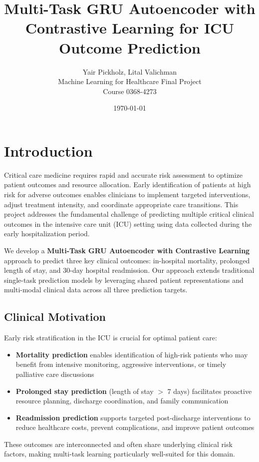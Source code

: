 \documentclass[11pt]{article}
\title{Multi-Task GRU Autoencoder with Contrastive Learning for ICU Outcome Prediction}
\author{Yair Pickholz, Lital Valichman\\
Machine Learning for Healthcare Final Project\\
Course 0368-4273}
\date{\today}
\begin{document}
\maketitle

\section{Introduction}

Critical care medicine requires rapid and accurate risk assessment to optimize patient outcomes and resource allocation. Early identification of patients at high risk for adverse outcomes enables clinicians to implement targeted interventions, adjust treatment intensity, and coordinate appropriate care transitions. This project addresses the fundamental challenge of predicting multiple critical clinical outcomes in the intensive care unit (ICU) setting using data collected during the early hospitalization period.

We develop a \textbf{Multi-Task GRU Autoencoder with Contrastive Learning} approach to predict three key clinical outcomes: in-hospital mortality, prolonged length of stay, and 30-day hospital readmission. Our approach extends traditional single-task prediction models by leveraging shared patient representations and multi-modal clinical data across all three prediction targets.

\subsection{Clinical Motivation}

Early risk stratification in the ICU is crucial for optimal patient care:

\begin{itemize}
    \item \textbf{Mortality prediction} enables identification of high-risk patients who may benefit from intensive monitoring, aggressive interventions, or timely palliative care discussions
    \item \textbf{Prolonged stay prediction} (length of stay $>$ 7 days) facilitates proactive resource planning, discharge coordination, and family communication
    \item \textbf{Readmission prediction} supports targeted post-discharge interventions to reduce healthcare costs, prevent complications, and improve patient outcomes
\end{itemize}

These outcomes are interconnected and often share underlying clinical risk factors, making multi-task learning particularly well-suited for this domain.
\end{document}
